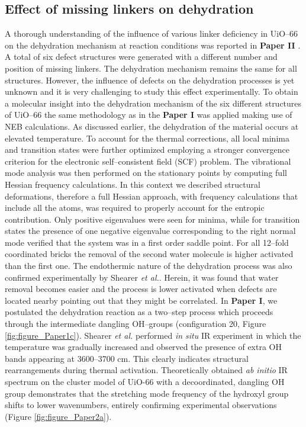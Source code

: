 \subsection*{Effect of missing linkers on dehydration}
A thorough understanding of the influence of various linker deficiency in
UiO--66 on the dehydration mechanism at reaction conditions was reported in
\textbf{Paper II} \cite{Vandichel2016}. A total of six defect structures
were generated with a different number and position of missing linkers.
The dehydration mechanism remains the same for all structures. However,
the influence of defects on the dehydration processes is yet unknown and it is very
challenging to study this effect experimentally. To obtain a molecular insight
into the dehydration mechanism of the six different structures of UiO--66 the
same methodology as in the \textbf{Paper I} was applied making use of
NEB calculations.
As discussed earlier, the dehydration of the material occurs at elevated
temperature. To account for the thermal corrections, all local minima and
transition states were further optimized employing a stronger convergence
criterion for the electronic self--consistent field (SCF) problem. The vibrational mode analysis was then performed on the
stationary points by computing full Hessian frequency calculations. In this
context we described structural deformations, therefore a full Hessian
approach, with frequency calculations that include all the atoms, was required
to properly account for the entropic contribution. Only positive eigenvalues were seen for minima, while for transition states the presence of one negative eigenvalue corresponding to the right normal mode verified that the system was in a first order saddle point.
For all 12--fold coordinated bricks the removal of the second water molecule is
higher activated than the first one. The endothermic nature of the dehydration
process was also confirmed experimentally by Shearer \textit{et
al.}\cite{Shearer2013}. Herein, it was found that water removal becomes easier
and the process is lower activated when defects are located nearby pointing out that they might be correlated.
\npar
In \textbf{Paper I}, we postulated the
dehydration reaction as a two--step process which proceeds through the
intermediate dangling OH--groups (configuration 20, Figure
\ref{fig:figure_Paper1c}). Shearer \textit{et
al.}\cite{Shearer2013} performed
\textit{in situ} IR experiment in which the temperature was gradually increased
and observed the presence of extra OH bands appearing at 3600--3700
cm. This clearly indicates structural rearrangements during thermal
activation. Theoretically obtained \textit{ab initio} IR spectrum on the cluster
model of UiO-66 with a decoordinated, dangling OH group demonstrates that the stretching
mode frequency of the hydroxyl group shifts to lower wavenumbers,
entirely confirming experimental observations (Figure \ref{fig:figure_Paper2a}).

